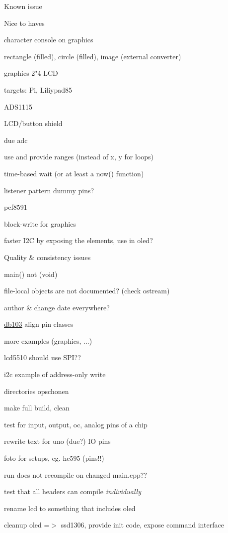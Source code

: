 Known issue

Nice to haves
\begin{DoxyItemize}
\item character console on graphics
\item rectangle (filled), circle (filled), image (external converter)
\item graphics 2"4 L\+CD
\item targets\+: Pi, Liliypad85
\item A\+D\+S1115
\item L\+C\+D/button shield
\item due adc
\item use and provide ranges (instead of x, y for loops)
\item time-\/based wait (or at least a now() function)
\item listener pattern \textquotesingle{}dummy\textquotesingle{} pins?
\item pcf8591
\item block-\/write for graphics
\item faster I2C by exposing the elements, use in oled?
\end{DoxyItemize}

Quality \& consistency issues
\begin{DoxyItemize}
\item main() not (void)
\item file-\/local objects are not documented? (check ostream)
\item author \& change date everywhere?
\item \hyperlink{namespacedb103}{db103} align pin classes
\item more examples (graphics, ...)
\item lcd5510 should use S\+PI??
\item i2c example of address-\/only write
\item directories opschonen
\item make full build, clean
\item test for input, output, oc, analog pins of a chip
\item rewrite text for uno (due?) IO pins
\item foto for setups, eg. hc595 (pins!!)
\item run does not recompile on changed main.\+cpp??
\item test that all headers can compile {\itshape individually}
\item rename lcd to something that includes oled
\item cleanup oled =$>$ ssd1306, provide init code, expose command interface
\end{DoxyItemize}

